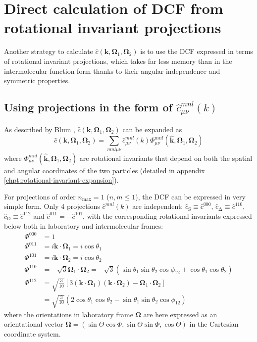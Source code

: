 \section{Direct calculation of DCF from rotational invariant projections}

Another strategy to calculate $\hat{c}(\mathbf{k},\mathbf{\Omega}_{1},\mathbf{\Omega}_{2})$
is to use the \acs{DCF} expressed in terms of rotational invariant
projections, which takes far less memory than in the intermolecular
function form thanks to their angular independence and symmetric properties. 

\subsection{Using projections in the form of $\hat{c}_{\mu\nu}^{mnl}(k)$\label{subsec:Using-projections-in}}

As described by Blum \citep{Blum_I}, $\hat{c}(\mathbf{k},\mathbf{\Omega}_{1},\mathbf{\Omega}_{2})$
can be expanded as
\begin{equation}
\hat{c}(\mathbf{k},\mathbf{\Omega}_{1},\mathbf{\Omega}_{2})=\sum_{mnl\mu\nu}\hat{c}_{\mu\nu}^{mnl}(k)\Phi_{\mu\nu}^{mnl}(\mathbf{\hat{k}},\mathbf{\Omega}_{1},\mathbf{\Omega}_{2})
\end{equation}
where $\Phi_{\mu\nu}^{mnl}(\mathbf{\hat{k}},\mathbf{\Omega}_{1},\mathbf{\Omega}_{2})$
are rotational invariants that depend on both the spatial and angular
coordinates of the two particles (detailed in appendix \ref{chpt:rotational-invariant-expansion}).

For projections of order $n_{\mathrm{max}}=1$ ($n,m\leq1$), the
\acs{DCF} can be expressed in very simple form. Only 4 projections
$\hat{c}^{mnl}(k)$ are independent: $\hat{c}_{\mathrm{S}}\equiv\hat{c}^{000}$,
$\hat{c}_{\mathrm{\Delta}}\equiv\hat{c}^{110}$, $\hat{c}_{\mathrm{D}}\equiv\hat{c}^{112}$
and $\hat{c}^{011}=-\hat{c}^{101}$, with the corresponding rotational
invariants expressed below both in laboratory and intermolecular frames:
\begin{align}
\Phi^{000} & =1\nonumber \\
\Phi^{011} & =i\mathbf{k}\cdot\mathbf{\Omega}_{1}=i\cos\theta_{1}\nonumber \\
\Phi^{101} & =i\mathbf{k}\cdot\mathbf{\Omega}_{2}=i\cos\theta_{2}\nonumber \\
\Phi^{110} & =-\sqrt{3}\mathbf{\Omega}_{1}\cdot\mathbf{\Omega}_{2}=-\sqrt{3}(\sin\theta_{1}\sin\theta_{2}\cos\phi_{12}+\cos\theta_{1}\cos\theta_{2})\nonumber \\
\Phi^{112} & =\sqrt{\frac{3}{10}}\left[3(\mathbf{k}\cdot\mathbf{\Omega}_{1})(\mathbf{k}\cdot\mathbf{\Omega}_{2})-\mathbf{\Omega}_{1}\cdot\mathbf{\Omega}_{2}\right]\\
 & =\sqrt{\frac{3}{10}}\left(2\cos\theta_{1}\cos\theta_{2}-\sin\theta_{1}\sin\theta_{2}\cos\phi_{12}\right)\nonumber 
\end{align}
where the orientations in laboratory frame $\mathbf{\Omega}$ are
here expressed as an orientational vector $\mathbf{\Omega}=(\sin\Theta\cos\Phi,\sin\Theta\sin\Phi,\cos\Theta)$
in the Cartesian coordinate system. 

